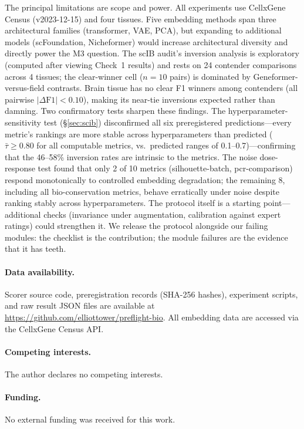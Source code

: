 \documentclass[9pt,lineno]{elife}
\begin{document}
The principal limitations are scope and power. All experiments use CellxGene Census (v2023-12-15) and four tissues. Five embedding methods span three architectural families (transformer, VAE, PCA), but expanding to additional models (scFoundation, Nicheformer) would increase architectural diversity and directly power the M3 question. The scIB audit's inversion analysis is exploratory (computed after viewing Check~1 results) and rests on 24 contender comparisons across 4 tissues; the clear-winner cell ($n = 10$ pairs) is dominated by Geneformer-versus-field contrasts. Brain tissue has no clear F1 winners among contenders (all pairwise $|\Delta\text{F1}| < 0.10$), making its near-tie inversions expected rather than damning. Two confirmatory tests sharpen these findings. The hyperparameter-sensitivity test (\S\ref{sec:scib}) disconfirmed all six preregistered predictions---every metric's rankings are more stable across hyperparameters than predicted ($\bar{\tau} \geq 0.80$ for all computable metrics, vs.\ predicted ranges of 0.1--0.7)---confirming that the 46--58\% inversion rates are intrinsic to the metrics. The noise dose-response test found that only 2 of 10 metrics (silhouette-batch, pcr-comparison) respond monotonically to controlled embedding degradation; the remaining 8, including all bio-conservation metrics, behave erratically under noise despite ranking stably across hyperparameters. The protocol itself is a starting point---additional checks (invariance under augmentation, calibration against expert ratings) could strengthen it. We release the protocol alongside our failing modules: the checklist is the contribution; the module failures are the evidence that it has teeth.

\paragraph{Data availability.} Scorer source code, preregistration records (SHA-256 hashes), experiment scripts, and raw result JSON files are available at \url{https://github.com/elliottower/preflight-bio}. All embedding data are accessed via the CellxGene Census API.

\paragraph{Competing interests.} The author declares no competing interests.

\paragraph{Funding.} No external funding was received for this work.
\end{document}

